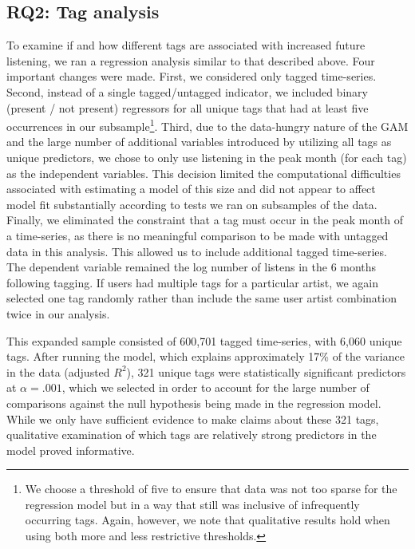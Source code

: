 \subsection{RQ2: Tag analysis}
To examine if and how different tags are associated with increased future listening, we ran a regression analysis similar to that described above. Four important changes were made. First, we considered only tagged time-series.  Second, instead of a single tagged/untagged indicator, we included binary (present / not present) regressors for all unique tags that had at least five occurrences in our subsample\footnote{We choose a threshold of five to ensure that data was not too sparse for the regression model but in a way that still was inclusive of infrequently occurring tags.  Again, however, we note that qualitative results hold when using both more and less restrictive thresholds.}. Third, due to the data-hungry nature of the GAM and the large number of additional variables introduced by utilizing all tags as unique predictors, we chose to only use listening in the peak month (for each tag) as the independent variables. This decision limited the computational difficulties associated with estimating a model of this size and did not appear to affect model fit substantially according to tests we ran on subsamples of the data. Finally, we eliminated the constraint that a tag must occur in the peak month of a time-series, as there is no meaningful comparison to be made with untagged data in this analysis. This allowed us to include additional tagged time-series. The dependent variable remained the log number of listens in the 6 months following tagging. If users had multiple tags for a particular artist, we again selected one tag randomly rather than include the same user artist combination twice in our analysis.

This expanded sample consisted of 600,701 tagged time-series, with 6,060 unique tags. After running the model, which explains approximately 17\% of the variance in the data (adjusted $R^{2}$), 321 unique tags were statistically significant predictors at $\alpha =.001$, which we selected in order to account for the large number of comparisons against the null hypothesis being made in the regression model. While we only have sufficient evidence to make claims about these 321 tags, qualitative examination of which tags are relatively strong predictors in the model proved informative.


